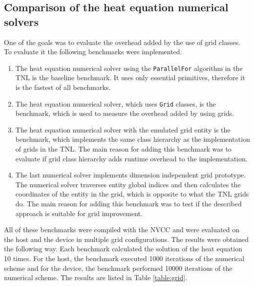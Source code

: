\subsection{Comparison of the heat equation numerical solvers}

One of the goals was to evaluate the overhead added by the use of grid classes.
To evaluate it the following benchmarks were implemented.

\begin{enumerate}
 \item{
  The heat equation numerical solver using the \texttt{ParallelFor} algorithm in the TNL is the baseline benchmark.
  It uses only essential primitives, therefore it is the fastest of all benchmarks.
 }
 \item {
  The heat equation numerical solver, which uses \texttt{Grid} classes, is the benchmark, which is used to measure the overhead added by using grids.
 }
 \item {
 The heat equation numerical solver with the emulated grid entity is the benchmark, which implements the same class hierarchy as the implementation of grids in the TNL.
 The main reason for adding this benchmark was to evaluate if grid class hierarchy adds runtime overhead to the implementation.
 }
 \item {
  The last numerical solver implements dimension independent grid prototype.
  The numerical solver traverses entity global indices and then calculates the coordinates of the entity in the grid, which is opposite to what the TNL grids do.
  The main reason for adding this benchmark was to test if the described approach is suitable for grid improvement.
 }
\end{enumerate}

All of these benchmarks were compiled with the NVCC and were evaluated on the host and the device in multiple grid configurations.
The results were obtained the following way.
Each benchmark calculated the solution of the heat equation 10 times.
For the host, the benchmark executed 1000 iterations of the numerical scheme and for the device, the benchmark performed 10000 iterations of the numerical scheme.
The results are listed in Table \ref{table:grid}.

